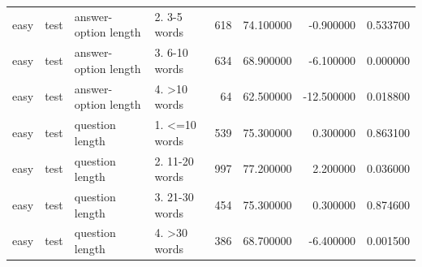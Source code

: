 \begin{tabular}{llllrrrr}
easy & test & answer-option length & 2. 3-5 words & 618 & 74.100000 & -0.900000 & 0.533700 \\
easy & test & answer-option length & 3. 6-10 words & 634 & 68.900000 & -6.100000 & 0.000000 \\
easy & test & answer-option length & 4. >10 words & 64 & 62.500000 & -12.500000 & 0.018800 \\
easy & test & question length & 1. <=10 words & 539 & 75.300000 & 0.300000 & 0.863100 \\
easy & test & question length & 2. 11-20 words & 997 & 77.200000 & 2.200000 & 0.036000 \\
easy & test & question length & 3. 21-30 words & 454 & 75.300000 & 0.300000 & 0.874600 \\
easy & test & question length & 4. >30 words & 386 & 68.700000 & -6.400000 & 0.001500 \\
\bottomrule
\end{tabular}

